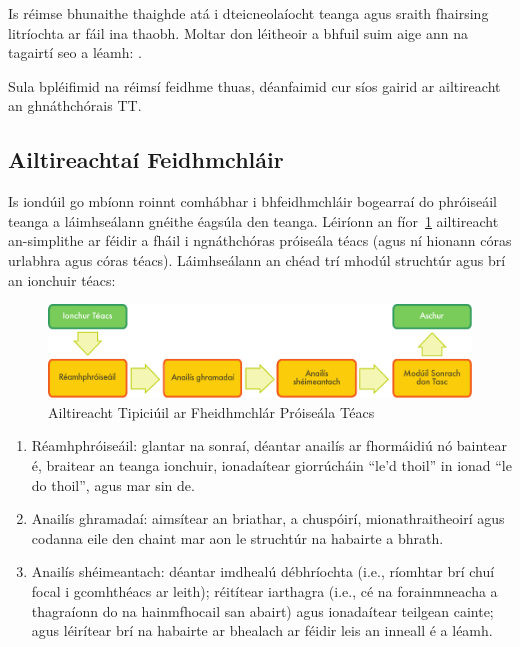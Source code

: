 \begin{multicols}{2}
Is réimse bhunaithe thaighde atá i dteicneolaíocht teanga agus sraith fhairsing litríochta ar fáil ina thaobh. Moltar don léitheoir a bhfuil suim aige ann na tagairtí seo a léamh: \cite{carstensen-etal1} \cite{jurafsky-martin01} \cite{manning-schuetze1} \cite{lt-world1} \cite{lt-survey1}. %

Sula bpléifimid na réimsí feidhme thuas, déanfaimid cur síos gairid ar ailtireacht an ghnáthchórais TT.

\subsection{Ailtireachtaí Feidhmchláir}

Is iondúil go mbíonn roinnt comhábhar i bhfeidhmchláir bogearraí do phróiseáil teanga a láimhseálann gnéithe éagsúla den teanga. Léiríonn an fíor~\ref{fig:textprocessingarch_de} ailtireacht an-simplithe ar féidir a fháil i ngnáthchóras próiseála téacs (agus ní hionann córas urlabhra agus córas téacs). Láimhseálann an chéad trí mhodúl struchtúr agus brí an ionchuir téacs:

\begin{figure}[hb]
  \center
  \includegraphics[width=\textwidth]{../_media/irish/text_processing_app_architecture}
  \caption{Ailtireacht Tipiciúil ar Fheidhmchlár Próiseála Téacs}
  \label{fig:textprocessingarch_de}
\end{figure}

\begin{enumerate}
\item Réamhphróiseáil: glantar na sonraí, déantar anailís ar fhormáidiú nó baintear é, braitear an teanga ionchuir, ionadaítear giorrúcháin ``le'd thoil'' in ionad ``le do thoil'', agus mar sin de.
\item Anailís ghramadaí: aimsítear an briathar, a chuspóirí, mionathraitheoirí agus codanna eile den chaint mar aon le struchtúr na habairte a bhrath.
\item Anailís shéimeantach: déantar imdhealú débhríochta (i.e., ríomhtar brí chuí focal i gcomhthéacs ar leith); réitítear iarthagra (i.e., cé na forainmneacha a thagraíonn do na hainmfhocail san abairt) agus ionadaítear teilgean cainte; agus léirítear brí na habairte ar bhealach ar féidir leis an inneall é a léamh.
\end{enumerate}


\end{multicols}
